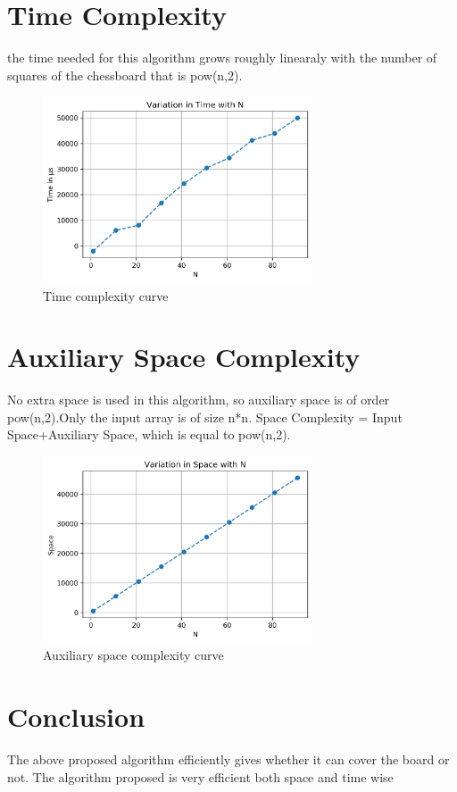 \documentclass[conference]{IEEEtran}
\begin{document}
\section{\textbf {Time Complexity}}
\noindent the time needed for this algorithm grows roughly linearaly with the number of squares of the chessboard that is pow(n,2).
\begin{figure}[htp]
    \centering
    \includegraphics[width=8cm]{time_com}
    \caption{Time complexity curve}
    \label{fig:time_com.png}
\end{figure}

\section{\textbf {Auxiliary Space Complexity}}
\noindent No extra space is used in this algorithm, so auxiliary space is of order pow(n,2).Only the input array is of size n*n.
Space Complexity = Input Space+Auxiliary Space, which is equal to pow(n,2).


\begin{figure}[htp]
    \centering
    \includegraphics[width=8cm]{Aux_space}
    \caption{Auxiliary space complexity curve}
    \label{fig:Aux_space.jpeg}
\end{figure}

\section{\textbf {Conclusion}} \noindent The above proposed algorithm efficiently gives whether it can cover the board or not. The algorithm proposed is very efficient both space and time wise \\
\end{document}
